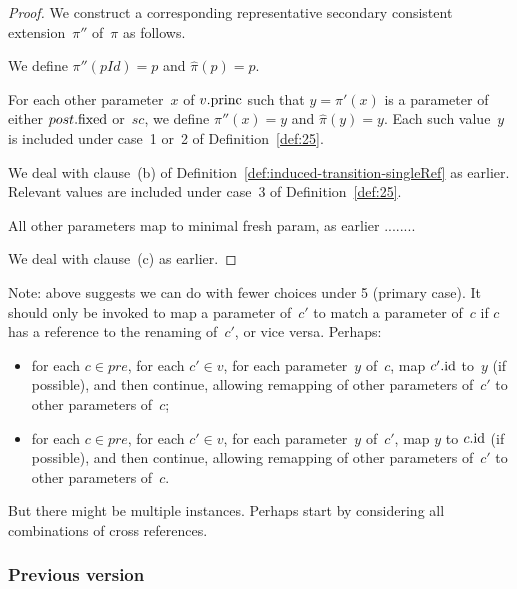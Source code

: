 \begin{proof}
We construct a corresponding representative secondary consistent
extension~$\pi''$ of~$\pi$ as follows.

We define $\pi''(pId) = p$ and $\hat\pi(p) = p$. 

For each other parameter~$x$ of $v.\mathrm{princ}$ such that $y = \pi'(x)$ is a
parameter of either $post.\mathrm{fixed}$ or~$sc$, we define $\pi''(x) = y$ and
$\hat\pi(y) = y$.  Each such value~$y$ is included under case~1 or~2 of
Definition~\ref{def:25}.   

We deal with clause~(b) of Definition~\ref{def:induced-transition-singleRef}
as earlier.  Relevant values are included under case~3 of
Definition~\ref{def:25}.

All other parameters map to minimal fresh param, as earlier ........

We deal with clause~(c) as earlier. 
\end{proof}

Note: above suggests we can do with fewer choices under 5 (primary case).  It
should only be invoked to map a parameter of~$c'$ to match a parameter of~$c$
if $c$ has a reference to the renaming of~$c'$, or vice versa.  Perhaps:
\begin{itemize}
\item for each $c \in pre$, for each $c' \in v$, for each parameter~$y$ of~$c$,
  map $c'.\mathrm{id}$ to~$y$ (if possible), and then continue, allowing remapping of
  other parameters of~$c'$ to other parameters of~$c$;

\item for each $c \in pre$, for each $c' \in v$, for each parameter~$y$
  of~$c'$, map $y$ to $c.\mathrm{id}$ (if possible), and then continue, allowing
  remapping of other parameters of~$c'$ to other parameters of~$c$.
\end{itemize}
%
But there might be multiple instances.  Perhaps start by considering all
combinations of cross references. 


\subsubsection{Previous version}

